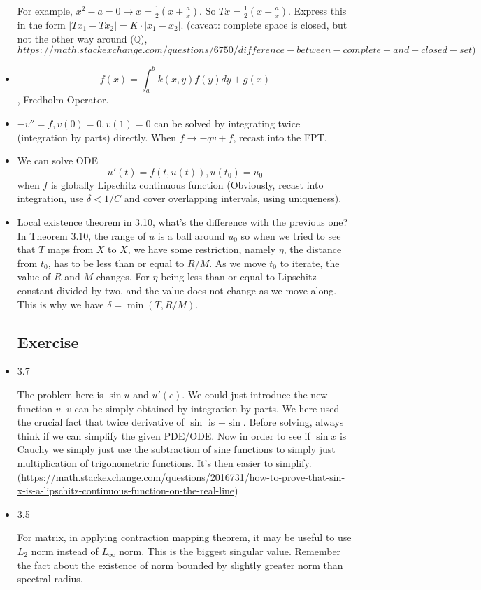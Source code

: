 \documentclass{article}
\theoremstyle{remark}
\begin{document}
\begin{itemize}
For example, $x^2-a=0\to x=\frac 12(x+\frac ax)$. So $Tx=\frac 12(x+\frac ax)$. Express this in the form $\lvert Tx_1-Tx_2\rvert =K\cdot\lvert x_1-x_2\rvert$. (caveat: complete space is closed, but not the other way around ($\mathbb{Q}$), $https://math.stackexchange.com/questions/6750/difference-between-complete-and-closed-set)$
\item $$f(x)=\int^b_a k(x,y)f(y)dy+g(x)$$, Fredholm Operator.

\item $-v''=f, v(0)=0, v(1)=0$ can be solved by integrating twice (integration by parts) directly. When $f\to-qv+f$, recast into the FPT.
\item We can solve ODE $$u'(t)=f(t,u(t)), u(t_0)=u_0$$ when $f$ is globally Lipschitz continuous function (Obviously, recast into integration, use $\delta<1/C$ and cover overlapping intervals, using uniqueness). 

\item Local existence theorem in 3.10, what's the difference with the previous one? In Theorem 3.10, the range of $u$ is a ball around $u_0$ so when we tried to see that $T$ maps from $X$ to $X$, we have some restriction, namely $\eta$, the distance from $t_0$, has to be less than or equal to $R/M$. As we move $t_0$ to iterate, the value of $R$ and $M$ changes. For $\eta$ being less than or equal to Lipschitz constant divided by two, and the value does not change as we move along. This is why we have $\delta=\min(T,R/M)$.
\subsection*{Exercise}
\item 3.7

The problem here is $\sin u$ and $u'(c)$. We could just introduce the new function $v$. $v$ can be simply obtained by integration by parts. We here used the crucial fact that twice derivative of $\sin$ is $-\sin$. Before solving, always think if we can simplify the given PDE/ODE. Now in order to see if $\sin x$ is Cauchy we simply just use the subtraction of sine functions to simply just multiplication of trigonometric functions. It's then easier to simplify. (\url{https://math.stackexchange.com/questions/2016731/how-to-prove-that-sin-x-is-a-lipschitz-continuous-function-on-the-real-line})

\item 3.5

For matrix, in applying contraction mapping theorem, it may be useful to use $L_2$ norm instead of $L_\infty$ norm. This is the biggest singular value. Remember the fact about the existence of norm bounded by slightly greater norm than spectral radius.


\end{itemize}
\end{document}
